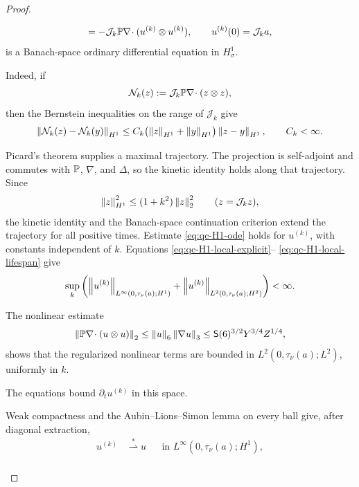 \begin{proof}
\begin{samepage}
\begin{equation}
 =-\mathcal J_k\mathbb P\nabla\!\cdot
   (u^{(k)}\otimes u^{(k)}),
 \qquad u^{(k)}(0)=\mathcal J_ka,
 \label{eq:qc-H1-Friedrichs-system}
\end{equation}
is a Banach-space ordinary differential equation in \(H^1_\sigma\).
\end{samepage}
\begin{samepage}
Indeed, if
\[
 \mathcal N_k(z):=\mathcal J_k\mathbb P\nabla\!\cdot(z\otimes z),
\]
then the Bernstein inequalities on the range of \(\mathcal J_k\) give
\begin{equation}
 \left\lVert \mathcal N_k(z)-\mathcal N_k(y)\right\rVert_{H^1}
 \le C_k\bigl(\left\lVert z\right\rVert_{H^1}+\left\lVert y\right\rVert_{H^1}\bigr)
       \left\lVert z-y\right\rVert_{H^1},
 \qquad C_k<\infty.
 \label{eq:qc-H1-Friedrichs-Lipschitz}
\end{equation}
\end{samepage}
Picard's theorem supplies a maximal trajectory.  The projection is
self-adjoint and commutes with \(\mathbb P\), \(\nabla\), and \(\Delta\), so the
kinetic identity holds along that trajectory.  Since
\begin{equation}
 \left\lVert z\right\rVert_{H^1}^2\le(1+k^2)\left\lVert z\right\rVert_2^2
 \qquad(z=\mathcal J_kz),
 \label{eq:qc-H1-Friedrichs-band-control}
\end{equation}
the kinetic identity and the Banach-space continuation criterion extend the
trajectory for all positive times.  Estimate
\eqref{eq:qc-H1-ode} holds for \(u^{(k)}\), with constants independent of
\(k\).  Equations \eqref{eq:qc-H1-local-explicit}--%
\eqref{eq:qc-H1-local-lifespan} give
\begin{equation}
 \sup_k\left(
 \left\lVert u^{(k)}\right\rVert_{L^\infty(0,\tau_\nu(a);H^1)}
 +\left\lVert u^{(k)}\right\rVert_{L^2(0,\tau_\nu(a);H^2)}
 \right)<\infty.
 \label{eq:qc-H1-Friedrichs-uniform}
\end{equation}
\begin{samepage}
The nonlinear estimate
\[
 \left\lVert \mathbb P\nabla\!\cdot(u\otimes u)\right\rVert_2
 \le \left\lVert u\right\rVert_6\left\lVert \nabla u\right\rVert_3
 \le \mathsf S(6)^{3/2}Y^{3/4}Z^{1/4},
\]
shows that the regularized nonlinear terms are bounded in
\(L^2(0,\tau_\nu(a);L^2)\), uniformly in \(k\).
\par
\end{samepage}
The equations bound
\(\partial_tu^{(k)}\) in this space.
\begin{samepage}
Weak compactness and the
Aubin--Lions--Simon lemma \cite{Aubin1963,Simon1987} on every ball give, after diagonal
extraction,
\begin{align*}
 u^{(k)}&\stackrel{*}{\rightharpoonup} u
 &&\text{in }L^\infty(0,\tau_\nu(a);H^1),\\

\end{align*}
\end{samepage}
\end{proof}
